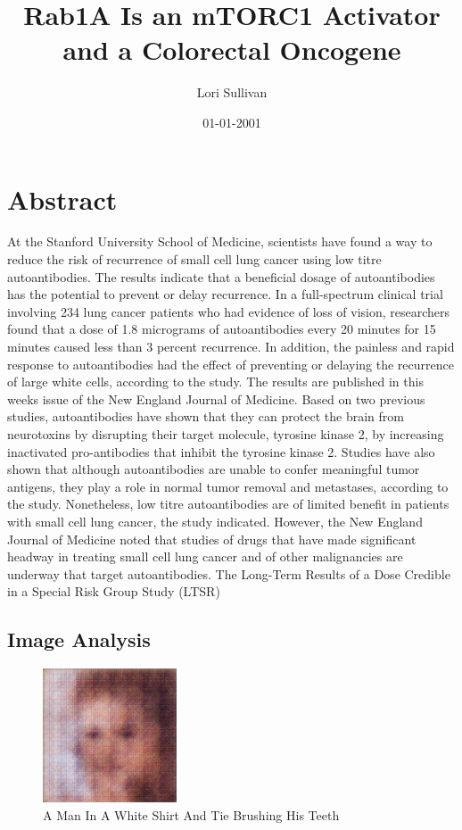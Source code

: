 \documentclass{article}%
\title{Rab1A Is an mTORC1 Activator and a Colorectal Oncogene}%
\author{Lori Sullivan}%
\affil{Department of Orthopedic Surgery, Xinhua Hospital, Shanghai Jiaotong University, School of Medicine, Shanghai 200092, P.R. China}%
\date{01{-}01{-}2001}%
\begin{document}
%
\normalsize%
\maketitle%
\section{Abstract}%
\label{sec:Abstract}%
At the Stanford University School of Medicine, scientists have found a way to reduce the risk of recurrence of small cell lung cancer using low titre autoantibodies.\newline%
The results indicate that a beneficial dosage of autoantibodies has the potential to prevent or delay recurrence.\newline%
In a full{-}spectrum clinical trial involving 234 lung cancer patients who had evidence of loss of vision, researchers found that a dose of 1.8 micrograms of autoantibodies every 20 minutes for 15 minutes caused less than 3 percent recurrence.\newline%
In addition, the painless and rapid response to autoantibodies had the effect of preventing or delaying the recurrence of large white cells, according to the study.\newline%
The results are published in this weeks issue of the New England Journal of Medicine.\newline%
Based on two previous studies, autoantibodies have shown that they can protect the brain from neurotoxins by disrupting their target molecule, tyrosine kinase 2, by increasing inactivated pro{-}antibodies that inhibit the tyrosine kinase 2.\newline%
Studies have also shown that although autoantibodies are unable to confer meaningful tumor antigens, they play a role in normal tumor removal and metastases, according to the study.\newline%
Nonetheless, low titre autoantibodies are of limited benefit in patients with small cell lung cancer, the study indicated.\newline%
However, the New England Journal of Medicine noted that studies of drugs that have made significant headway in treating small cell lung cancer and of other malignancies are underway that target autoantibodies.\newline%
The Long{-}Term Results of a Dose Credible in a Special Risk Group Study (LTSR)

%
\subsection{Image Analysis}%
\label{subsec:ImageAnalysis}%


\begin{figure}[h!]%
\centering%
\includegraphics[width=150px]{500_fake_images/samples_5_412.png}%
\caption{A Man In A White Shirt And Tie Brushing His Teeth}%
\end{figure}

%
\end{document}
